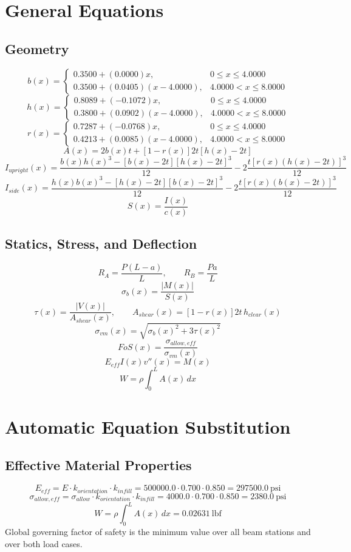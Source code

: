 \documentclass[11pt]{article}
\begin{document}
\section*{General Equations}
\subsection*{Geometry}
\[
b(x)=\begin{cases}0.3500 + (0.0000)x, & 0 \le x \le 4.0000\\0.3500 + (0.0405)(x-4.0000), & 4.0000 < x \le 8.0000\end{cases}
\]
\[
h(x)=\begin{cases}0.8089 + (-0.1072)x, & 0 \le x \le 4.0000\\0.3800 + (0.0902)(x-4.0000), & 4.0000 < x \le 8.0000\end{cases}
\]
\[
r(x)=\begin{cases}0.7287 + (-0.0768)x, & 0 \le x \le 4.0000\\0.4213 + (0.0085)(x-4.0000), & 4.0000 < x \le 8.0000\end{cases}
\]
\[
A(x)=2b(x)t+[1-r(x)]2t[h(x)-2t]
\]
\[
I_{upright}(x)=\frac{b(x)h(x)^3-[b(x)-2t][h(x)-2t]^3}{12}-2\frac{t[r(x)(h(x)-2t)]^3}{12}
\]
\[
I_{side}(x)=\frac{h(x)b(x)^3-[h(x)-2t][b(x)-2t]^3}{12}-2\frac{t[r(x)(b(x)-2t)]^3}{12}
\]
\[
S(x)=\frac{I(x)}{c(x)}
\]

\subsection*{Statics, Stress, and Deflection}
\[
R_A=\frac{P(L-a)}{L}, \qquad R_B=\frac{Pa}{L}
\]
\[
\sigma_b(x)=\frac{|M(x)|}{S(x)}
\]
\[
\tau(x)=\frac{|V(x)|}{A_{shear}(x)}, \qquad A_{shear}(x)=[1-r(x)]2t\,h_{clear}(x)
\]
\[
\sigma_{vm}(x)=\sqrt{\sigma_b(x)^2+3\tau(x)^2}
\]
\[
FoS(x)=\frac{\sigma_{allow,eff}}{\sigma_{vm}(x)}
\]
\[
E_{eff}I(x)v''(x)=M(x)
\]
\[
W=\rho\int_0^L A(x)\,dx
\]

\section*{Automatic Equation Substitution}
\subsection*{Effective Material Properties}
\[E_{eff} = E \cdot k_{orientation} \cdot k_{infill} = 500000.0 \cdot 0.700 \cdot 0.850 = 297500.0\ \mathrm{psi}\]
\[\sigma_{allow,eff} = \sigma_{allow} \cdot k_{orientation} \cdot k_{infill} = 4000.0 \cdot 0.700 \cdot 0.850 = 2380.0\ \mathrm{psi}\]
\[W = \rho \int_0^L A(x)\,dx = 0.02631\ \mathrm{lbf}\]
Global governing factor of safety is the minimum value over all beam stations and over both load cases.
\end{document}
